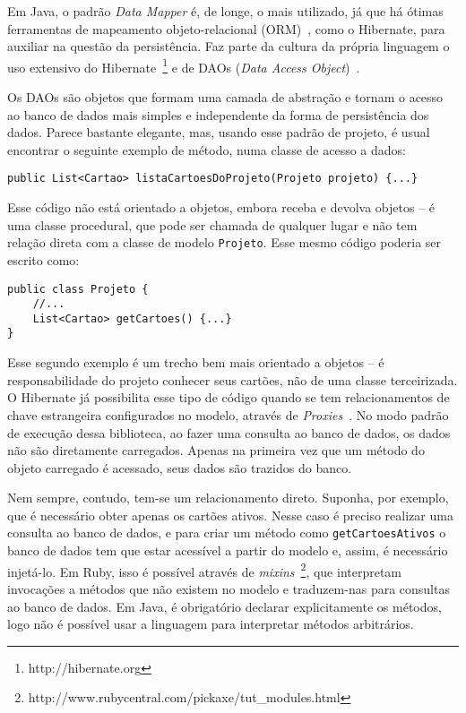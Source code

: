 Em Java, o padrão \textit{Data Mapper} é, de longe, o mais utilizado, já que há ótimas ferramentas de mapeamento objeto-relacional (ORM)~\cite{orm}, como o Hibernate, para auxiliar na questão da persistência. Faz parte da cultura da própria linguagem o uso extensivo do Hibernate~\footnote{http://hibernate.org} e de DAOs (\textit{Data Access Object})~\cite{dao}.

Os DAOs são objetos que formam uma camada de abstração e tornam o acesso ao banco de dados mais simples e independente da forma de persistência dos dados. Parece bastante elegante, mas, usando esse padrão de projeto, é usual encontrar o seguinte exemplo de método, numa classe de acesso a dados:

\begin{lstlisting}
public List<Cartao> listaCartoesDoProjeto(Projeto projeto) {...}
\end{lstlisting}

Esse código não está orientado a objetos, embora receba e devolva objetos -- é uma classe procedural, que pode ser chamada de qualquer lugar e não tem relação direta com a classe de modelo \texttt{Projeto}. Esse mesmo código poderia ser escrito como:

\begin{lstlisting}
public class Projeto {
	//...
	List<Cartao> getCartoes() {...}
}
\end{lstlisting}

Esse segundo exemplo é um trecho bem mais orientado a objetos -- é responsabilidade do projeto conhecer seus cartões, não de uma classe terceirizada. O Hibernate já possibilita esse tipo de código quando se tem relacionamentos de chave estrangeira configurados no modelo, através de \textit{Proxies}~\cite{gof}. No modo padrão de execução dessa biblioteca, ao fazer uma consulta ao banco de dados, os dados não são diretamente carregados. Apenas na primeira vez que um método do objeto carregado é acessado, seus dados são trazidos do banco. 

Nem sempre, contudo, tem-se um relacionamento direto. Suponha, por exemplo, que é necessário obter apenas os cartões ativos. Nesse caso é preciso realizar uma consulta ao banco de dados, e para criar um método como \texttt{getCartoesAtivos} o banco de dados tem que estar acessível a partir do modelo e, assim, é necessário injetá-lo. Em Ruby, isso é possível através de \textit{mixins}~\footnote{http://www.rubycentral.com/pickaxe/tut\_modules.html}, que interpretam invocações a métodos que não existem no modelo e traduzem-nas para consultas ao banco de dados. Em Java, é obrigatório declarar explicitamente os métodos, logo não é possível usar a linguagem para interpretar métodos arbitrários.

